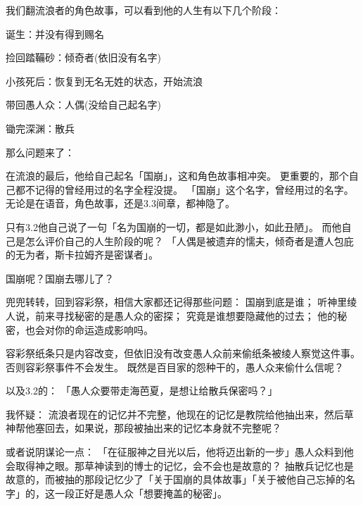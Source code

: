 \dividearticles
{}
\begin{multicols*}{2}
	我们翻流浪者的角色故事，可以看到他的人生有以下几个阶段：

	诞生：并没有得到赐名


	捡回踏鞴砂：倾奇者(依旧没有名字)


	小孩死后：恢复到无名无姓的状态，开始流浪


	带回愚人众：人偶(没给自己起名字)


	锄完深渊：散兵


	那么问题来了：


	在流浪的最后，他给自己起名「国崩」，这和角色故事相冲突。
	更重要的，那个自己都不记得的曾经用过的名字全程没提。
	「国崩」这个名字，曾经用过的名字。无论是在语音，角色故事，还是3.3间章，都神隐了。

	只有3.2他自己说了一句「名为国崩的一切，都是如此渺小，如此丑陋」。
	而他自己是怎么评价自己的人生阶段的呢？
	「人偶是被遗弃的懦夫，倾奇者是遭人包庇的无为者，斯卡拉姆齐是密谋者」。

	国崩呢？国崩去哪儿了？

	兜兜转转，回到容彩祭，相信大家都还记得那些问题：
	国崩到底是谁；
	听神里绫人说，前来寻找秘密的是愚人众的密探；
	究竟是谁想要隐藏他的过去；
	他的秘密，也会对你的命运造成影响吗。

	容彩祭纸条只是内容改变，但依旧没有改变愚人众前来偷纸条被绫人察觉这件事。否则容彩祭事件不会发生。
	既然是百目家的怨种干的，愚人众来偷什么信呢？

	以及3.2的：
	「愚人众要带走海芭夏，是想让给散兵保密吗？」

	我怀疑：
	流浪者现在的记忆并不完整，他现在的记忆是教院给他抽出来，然后草神帮他塞回去，如果说，那段被抽出来的记忆本身就不完整呢？

	或者说阴谋论一点：
	「在征服神之目光以后，他将迈出新的一步」愚人众料到他会取得神之眼。那草神读到的博士的记忆，会不会也是故意的？
	抽散兵记忆也是故意的，而被抽的那段记忆少了「关于国崩的具体故事」「关于被他自己忘掉的名字」的，这一段正好是愚人众「想要掩盖的秘密」。


\end{multicols*}

